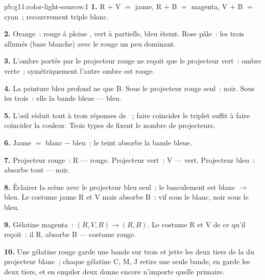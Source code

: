 \begin{solution}{pb:g11:color-light-sources:1}
\textbf{1.} R $+$ V $=$ jaune, R $+$ B $=$ magenta, V $+$ B $=$ cyan~;
recouvrement triple blanc.

\textbf{2.} Orange~: rouge à pleine
, vert à
 partielle, bleu éteint. Rose pâle~:
les trois allumés (base blanche) avec le rouge un peu dominant.

\textbf{3.} L'ombre portée par le projecteur rouge ne reçoit que le
projecteur vert~: ombre verte~; symétriquement l'autre ombre est
rouge.

\textbf{4.} La peinture bleu profond ne
 que B. Sous le projecteur rouge
seul~: noir. Sous les trois~: elle
 la bande bleue --- bleu.

\textbf{5.} L'œil réduit tout  à trois
réponses de ~; faire coïncider le triplet
suffit à faire coïncider la couleur. Trois types de
 fixent le nombre de projecteurs.

\textbf{6.} Jaune $=$ blanc $-$ bleu~: le teint absorbe la bande
bleue.

\textbf{7.} Projecteur rouge~:
 R --- rouge. Projecteur vert~:
 V --- vert. Projecteur bleu~:
absorbe tout --- noir.

\textbf{8.} Éclairer la scène avec le projecteur bleu seul~; le
basculement est blanc $\to$ bleu. Le costume jaune
 R et V mais absorbe B~: vif sous
le blanc, noir sous le bleu.

\textbf{9.} Gélatine magenta~: $(R, V, B) \to (R, B)$. Le costume
 R et V de ce qu'il reçoit~: il
 R, absorbe B --- costume rouge.

\textbf{10.} Une gélatine rouge garde une bande sur trois et jette
les deux tiers de la  du projecteur
blanc~; chaque gélatine C, M, J retire une seule bande, en garde les
deux tiers, et en empiler deux donne encore n'importe quelle primaire.


\end{solution}

